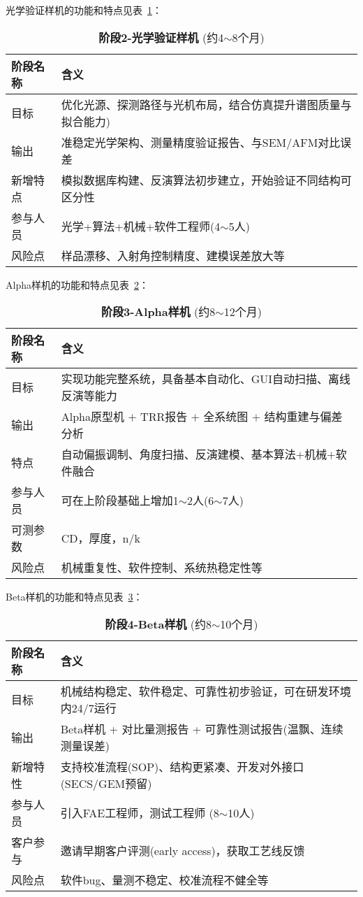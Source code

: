 光学验证样机的功能和特点见表~\ref{table:OFB}：
\begin{table}[h!]
\centering
\caption{\textbf{阶段2-光学验证样机} (约4$\sim$8个月)}
\label{table:OFB}
\begin{tabular}{l|l}
\hline\hline
\textbf{阶段名称} & \textbf{含义} \\ \hline
目标 & 优化光源、探测路径与光机布局，结合仿真提升谱图质量与拟合能力) \\ \hline
输出 & 准稳定光学架构、测量精度验证报告、与SEM/AFM对比误差 \\ \hline
新增特点 & 模拟数据库构建、反演算法初步建立，开始验证不同结构可区分性 \\ \hline
参与人员 & 光学+算法+机械+软件工程师(4$\sim$5人) \\ \hline
风险点 & 样品漂移、入射角控制精度、建模误差放大等 \\
\hline\hline
\end{tabular}
\end{table}

Alpha样机的功能和特点见表~\ref{table:alpha}：
\begin{table}[h!]
\centering
\caption{\textbf{阶段3-Alpha样机} (约8$\sim$12个月)}
\label{table:alpha}
\begin{tabular}{l|l}
\hline\hline
\textbf{阶段名称} & \textbf{含义} \\ \hline
目标 & 实现功能完整系统，具备基本自动化、GUI自动扫描、离线反演等能力 \\ \hline
输出 & Alpha原型机 $+$ TRR报告 $+$ 全系统图 $+$ 结构重建与偏差分析 \\ \hline
特点 & 自动偏振调制、角度扫描、反演建模、基本算法$+$机械$+$软件融合 \\ \hline
参与人员 & 可在上阶段基础上增加1$\sim$2人(6$\sim$7人)  \\ \hline
可测参数 & CD，厚度，n/k  \\ \hline
风险点 & 机械重复性、软件控制、系统热稳定性等 \\
\hline\hline
\end{tabular}
\end{table}

Beta样机的功能和特点见表~\ref{table:beta}：
\begin{table}[h!]
\centering
\caption{\textbf{阶段4-Beta样机} (约8$\sim$10个月)}
\label{table:beta}
\begin{tabular}{l|l}
\hline\hline
\textbf{阶段名称} & \textbf{含义} \\ \hline
目标 & 机械结构稳定、软件稳定、可靠性初步验证，可在研发环境内24/7运行 \\ \hline
输出 & Beta样机 + 对比量测报告 + 可靠性测试报告(温飘、连续测量误差) \\ \hline
新增特性 & 支持校准流程(SOP)、结构更紧凑、开发对外接口(SECS/GEM预留) \\ \hline
参与人员 & 引入FAE工程师，测试工程师 (8$\sim$10人)  \\ \hline
客户参与 & 邀请早期客户评测(early access)，获取工艺线反馈  \\ \hline
风险点 & 软件bug、量测不稳定、校准流程不健全等 \\
\hline\hline
\end{tabular}
\end{table}

